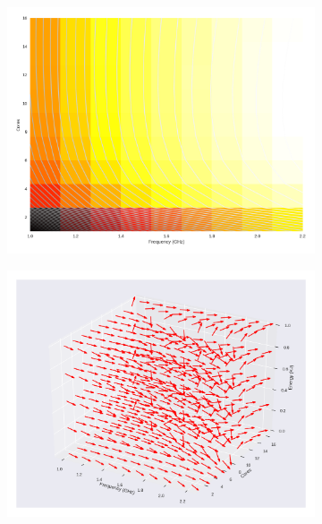\begin{figure}[H]

	\centering

	\begin{subfigure}[b]{0.45\textwidth}

		\includegraphics[width=\textwidth]{models/figures/analisys/pdyn0.png}

	\end{subfigure}


	\begin{subfigure}[b]{0.45\textwidth}

		\includegraphics[width=\textwidth]{models/figures/analisys/pdyn0_3d.png}

	\end{subfigure}

\end{figure}


